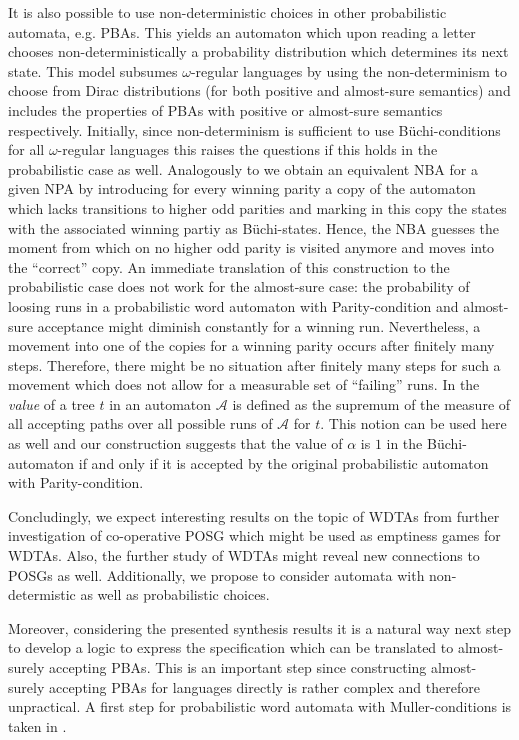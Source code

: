 It is also possible to use non-deterministic choices in other probabilistic
automata, e.g. \acp{PBA}. This yields an automaton which upon reading a
letter chooses non-deterministically a probability distribution which
determines its next state. This model subsumes $\omega$-regular languages by
using the non-determinism to choose from Dirac distributions (for both positive
and almost-sure semantics) and includes the properties of \acp{PBA} with
positive or almost-sure semantics respectively. Initially, since
non-determinism is sufficient to use Büchi-conditions for all $\omega$-regular
languages this raises the questions if this holds in the probabilistic case as
well. Analogously to \cite[Theorem 1.10]{AutoLogInfGames} we obtain an
equivalent \ac{NBA} for a given \ac{NPA} by introducing for every winning
parity a copy of the automaton which lacks transitions to higher odd parities
and marking in this copy the states with the associated winning partiy as
Büchi-states. Hence, the \ac{NBA} guesses the moment from which on no higher
odd parity is visited anymore and moves into the \enquote{correct} copy. An
immediate translation of this construction to the probabilistic case does not
work for the almost-sure case: the probability of loosing runs in a
probabilistic word automaton with Parity-condition and almost-sure acceptance
might diminish constantly for a winning run. Nevertheless, a movement into one
of the copies for a winning parity occurs after finitely many steps. Therefore,
there might be no situation after finitely many steps for such a movement which
does not allow for a measurable set of \enquote{failing} runs. In
\cite{RandAutoInfTrees} the \emph{value} of a tree $t$ in an automaton
$\mathcal{A}$ is defined as the supremum of the measure of all accepting paths
over all possible runs of $\mathcal{A}$ for $t$. This notion can be used here
as well and our construction suggests that the value of $\alpha$ is $1$ in the
Büchi-automaton if and only if it is accepted by the original probabilistic
automaton with Parity-condition.

Concludingly, we expect interesting results on the topic of \acp{WDTA} from
further investigation of co-operative \ac{POSG} which might be used as
emptiness games for \acp{WDTA}. Also, the further study of \acp{WDTA} might
reveal new connections to \acp{POSG} as well. Additionally, we propose to
consider automata with non-determistic as well as probabilistic choices.

Moreover, considering the presented synthesis results it is a natural way next
step to develop a logic to express the specification which can be translated to
almost-surely accepting \acp{PBA}. This is an important step since constructing
almost-surely accepting \acp{PBA} for languages directly is rather complex and
therefore unpractical. A first step for probabilistic word automata with
Muller-conditions is taken in \cite{ProbAutoProbLog}.

